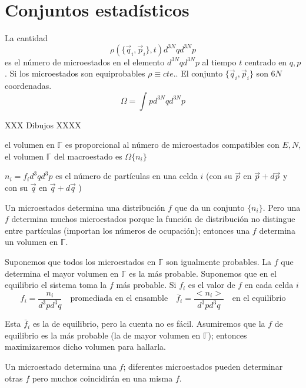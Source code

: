 \documentclass[10pt,oneside]{CBFT_book}
\begin{document}
\chapter{Conjuntos estadísticos}

La cantidad
\[
	\rho(\{ \vec{q}_i, \vec{p}_i\},t) d^{3N}qd^{3N}p
\]
es el número de microestados en el elemento $d^{3N}qd^{3N}p$ al tiempo $t$ centrado en $q,p$.
Si los microestados son equiprobables $\rho \equiv cte.$. El conjunto $\{ \vec{q}_i, \vec{p}_i\}$ son
$6N$ coordenadas.
\[
	\Omega = \int p d^{3N}qd^{3N}p
\]

XXX Dibujos XXXX

el volumen en  $\mathbb{\Gamma}$ es proporcional al número de microestados compatibles con $E,N$,
el volumen $ \mathbb{\Gamma}$ del macroestado es $\Omega\{ n_i \}$

$n_i = f_i d^3q d^3p$ es el número de partículas en una celda $i$ (con su $\vec{p}$ en $\vec{p} + d\vec{p}$
y con su $\vec{q}$ en $\vec{q} + d\vec{q}$ )

Un microestados determina una distribución $f$ que da un conjunto $\{ n_i \}$. Pero una $f$ determina muchos
microestados porque la función de distribución no distingue entre partículas (importan los números de 
ocupación); entonces una $f$ determina un volumen en $\mathbb{\Gamma}$.

Suponemos que todos los microestados en $\mathbb{\Gamma}$ son igualmente probables.
La $f$ que determina el mayor volumen en  $\mathbb{\Gamma}$ es la más probable. Suponemos que en el 
equilibrio el sistema toma la $f$ más probable.
Si $f_i$ es el valor de $f$ en cada celda $i$
\[
	f_i = \frac{n_i}{d^3p d^3q} \quad \text{promediada en el ensamble} \quad \bar{f}_i =  \frac{<n_i>}{d^3p d^3q}
	\quad \text{en el equilibrio}
\]

Esta $\bar{f}_i$ es la de equilibrio, pero la cuenta no es fácil. Asumiremos que la $f$ de equilibrio es la más
probable (la de mayor volumen en  $\mathbb{\Gamma}$); entonces maximizaremos dicho volumen para hallarla.

Un microestado determina una $f$; diferentes microestados pueden determinar otras $f$ pero muchos coincidirán en
una misma $f$.
\end{document}
